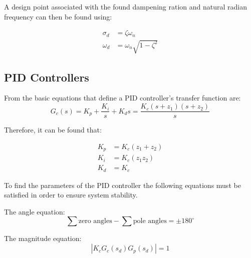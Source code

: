 A design point associated with the found dampening ration and natural radian frequency can then be found using:~\cite{control_systems}

\begin{align}
    \sigma_d &= \zeta\omega_n \label{eq:sigma_d}\\
    \omega_d &= \omega_n \sqrt{1-\zeta^2}\label{eq:omega_d}
\end{align}

\subsection{PID Controllers}
From \cite{control_systems} the basic equations that define a PID controller's transfer function are:
\begin{equation}
    G_c(s) = K_p + \frac{K_i}{s} + K_d s = \frac{K_c (s + z_1)(s + z_2)}{s}\label{eq:PID_TF}
\end{equation}

Therefore, it can be found that:

\begin{align}
    K_p &= K_c (z_1 + z_2)\label{eq:Kp_from_Kc}\\
    K_i &= K_c (z_1z_2)\label{eq:Ki_from_Kc}\\
    K_d &= K_c\label{eq:Kd_from_Kc}
\end{align}

To find the parameters of the PID controller the following equations must be satisfied in order to ensure system stability.

The angle equation:
\begin{equation}
    \sum{\text{zero angles}} - \sum{\text{pole angles}} = \pm 180^\circ\label{eq:root_locus_angle_condition}
\end{equation}

The magnitude equation:
\begin{equation}
    |K_c G_c(s_d)G_p(s_d)| = 1\label{eq:root_locus_mag_condition}
\end{equation}

